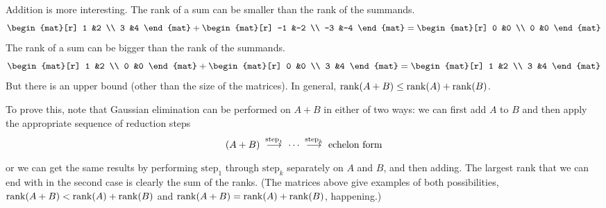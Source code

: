 \begin{exercises}
\begin{answer}
      Addition is more interesting.
      The rank of a sum can be smaller than the rank of the summands.
      \begin{equation*}
        \begin{mat}[r]
          1  &2  \\
          3  &4
        \end{mat}
        +
        \begin{mat}[r]
         -1  &-2  \\
         -3  &-4
        \end{mat}
        =
        \begin{mat}[r]
         0   &0   \\
         0   &0
        \end{mat}
      \end{equation*}
      The rank of a sum can be bigger than the rank of the summands.
      \begin{equation*}
        \begin{mat}[r]
          1  &2  \\
          0  &0
        \end{mat}
        +
        \begin{mat}[r]
          0  &0   \\
          3  &4
        \end{mat}
        =
        \begin{mat}[r]
         1   &2   \\
         3   &4
        \end{mat}
      \end{equation*}
      But there is an upper bound (other than the size of the matrices).
      In general, \( \operatorname{rank}(A+B)\leq\operatorname{rank}(A)+\operatorname{rank}(B) \).

      To prove this, note that Gaussian elimination can be performed on
      \( A+B \) in either of two ways:
      we can first add \( A \) to \( B \) and then apply the appropriate
      sequence of reduction steps
      \begin{equation*}
        (A+B)
        \;\mathrel{ \mathop{\longrightarrow}\limits^{\text{step}_1\mathstrut}_{ \begin{subarray}{l} \relax \end{subarray}}}
        \;\cdots
        \;\mathrel{ \mathop{\longrightarrow}\limits^{\text{step}_k\mathstrut}_{ \begin{subarray}{l} \relax \end{subarray}}}
        \;\text{echelon form}
      \end{equation*}
      or we can get the same results by performing \( \text{step}_1 \) through
      \( \text{step}_k \) separately on \( A \) and \( B \), and then adding.
      The largest rank that we can end with in the second case is clearly 
      the sum of the ranks.
      (The matrices above give examples of both possibilities,  
       $\operatorname{rank}(A+B)<\operatorname{rank}(A)+\operatorname{rank}(B)$ and $\operatorname{rank}(A+B)=\operatorname{rank}(A)+\operatorname{rank}(B)$,
       happening.)
    \end{answer}
\end{exercises}
